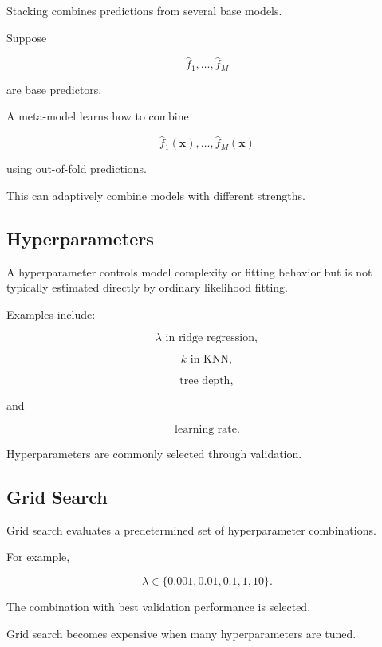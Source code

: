 Stacking combines predictions from several base models.

Suppose

\[
\widehat{f}_1,\ldots,\widehat{f}_M
\]

are base predictors.

A meta-model learns how to combine

\[
\boxed{
\widehat{f}_1(\mathbf{x}),
\ldots,
\widehat{f}_M(\mathbf{x})
}
\]

using out-of-fold predictions.

This can adaptively combine models with different strengths.

\subsection{Hyperparameters}
\label{subsec:hyperparameters-learning}

A hyperparameter controls model complexity or fitting behavior but is not
typically estimated directly by ordinary likelihood fitting.

Examples include:

\[
\boxed{
\lambda
\text{ in ridge regression},
}
\]

\[
\boxed{
k
\text{ in KNN},
}
\]

\[
\boxed{
\text{tree depth},
}
\]

and

\[
\boxed{
\text{learning rate}.
}
\]

Hyperparameters are commonly selected through validation.

\subsection{Grid Search}
\label{subsec:grid-search}

Grid search evaluates a predetermined set of hyperparameter combinations.

For example,

\[
\lambda
\in
\{
0.001,
0.01,
0.1,
1,
10
\}.
\]

The combination with best validation performance is selected.

Grid search becomes expensive when many hyperparameters are tuned.

